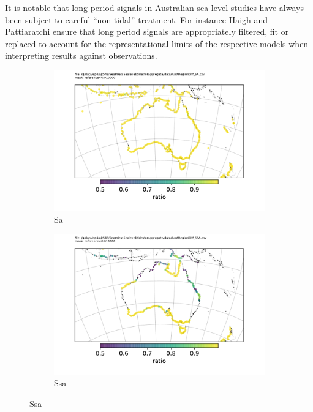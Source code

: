 It is notable that long period signals in Australian sea level studies have always been subject to careful ``non-tidal'' treatment. For instance Haigh \citep{Haigh:2013bn} and Pattiaratchi \citep{Pattiaratchi2018} ensure that long period signals are appropriately filtered, fit or replaced to account for the representational limits of the respective models when interpreting results against observations.

\begin{figure}[!hbt] \centering
    \begin{subfigure}[b]{\figwidthHalf}
        \includegraphics[width=\textwidth]{figures/maps/AustRegionDiff_SA.pdf}
        \caption{Sa}
    \end{subfigure}
    \begin{subfigure}[b]{\figwidthHalf}
        \includegraphics[width=\textwidth]{figures/maps/AustRegionDiff_SSA.pdf}
        \caption{Ssa}

\end{subfigure}
\end{figure}
